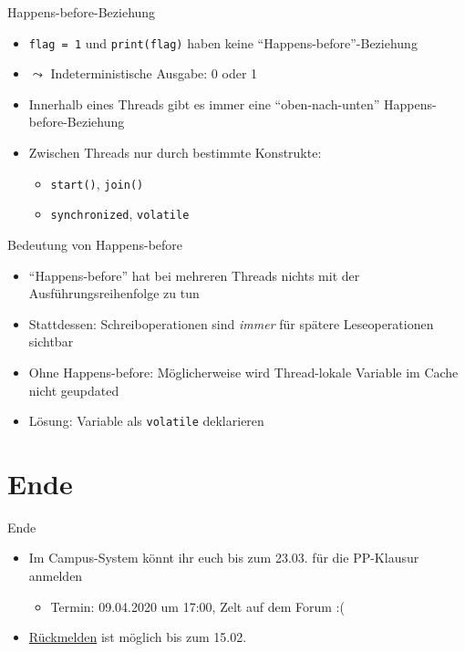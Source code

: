 \documentclass{beamer}
\newcommand{\code}[1]{
	\begin{mdframed}
		
	\end{mdframed}
}
\begin{document}
\begin{frame}{Happens-before-Beziehung}
  \code{code/happens-before.java}

  \begin{itemize}
    \item \texttt{flag = 1} und \texttt{print(flag)} haben keine \enquote{Happens-before}-Beziehung
    \item $\leadsto$ Indeterministische Ausgabe: 0 oder 1
    \item Innerhalb eines Threads gibt es immer eine \enquote{oben-nach-unten} Happens-before-Beziehung
    \item Zwischen Threads nur durch bestimmte Konstrukte:
    \begin{itemize}
      \item \texttt{start()}, \texttt{join()}
      \item \texttt{synchronized}, \texttt{volatile}
    \end{itemize}
  \end{itemize}
\end{frame}

\begin{frame}{Bedeutung von Happens-before}
  \code{code/happens-before2.java}

  {\small
  \begin{itemize}
    \item \enquote{Happens-before} hat bei mehreren Threads nichts mit der Ausführungsreihenfolge zu tun
    \item Stattdessen: Schreiboperationen sind \emph{immer} für spätere Leseoperationen sichtbar
    \item Ohne Happens-before: Möglicherweise wird Thread-lokale Variable im Cache nicht geupdated
    \item Lösung: Variable als \texttt{volatile} deklarieren
  \end{itemize}
  }
\end{frame}

\section{Ende}

\begin{frame}{Ende}
	\begin{itemize}
		\item Im Campus-System könnt ihr euch bis zum 23.03. für die PP-Klausur anmelden
                \begin{itemize}
                  \item Termin: 09.04.2020 um 17:00, Zelt auf dem Forum :(
                \end{itemize}
		\item \href{https://campus.studium.kit.edu/renewal/payment.php}{Rückmelden} ist möglich bis zum 15.02.
	\end{itemize}
\end{frame}
\end{document}
